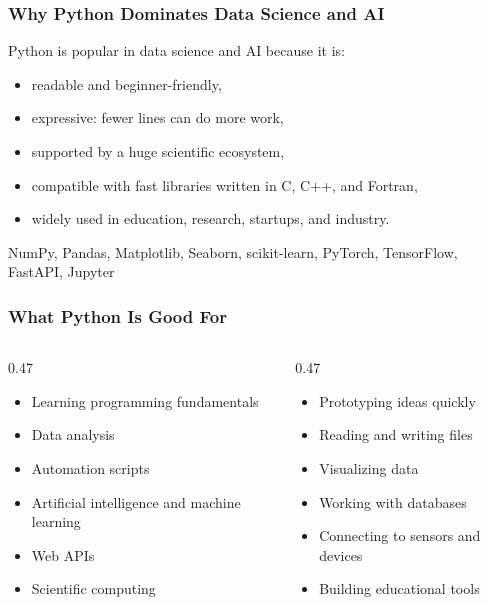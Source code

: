 \documentclass[aspectratio=169,10pt]{beamer}
\newcommand{\myitem}[1]{\item #1\vspace{0.04cm}}
\begin{document}
\begin{frame}
\frametitle{Why Python Dominates Data Science and AI}
\vspace{0.7cm}
{\large Python is popular in data science and AI because it is:}
\vspace{0.15cm}
\begin{itemize}
  \myitem{readable and beginner-friendly,}
  \myitem{expressive: fewer lines can do more work,}
  \myitem{supported by a huge scientific ecosystem,}
  \myitem{compatible with fast libraries written in C, C++, and Fortran,}
  \myitem{widely used in education, research, startups, and industry.}
\end{itemize}

\vspace{0.15cm}
\begin{tcolorbox}[lecturebox,title=Important libraries you will meet later]
\ttfamily NumPy, Pandas, Matplotlib, Seaborn, scikit-learn, PyTorch, TensorFlow, FastAPI, Jupyter
\end{tcolorbox}
\end{frame}


\begin{frame}
\frametitle{What Python Is Good For}
\vspace{1.1cm}
\begin{columns}[T,totalwidth=\textwidth]
\begin{column}{0.47\textwidth}
\begin{itemize}
  \myitem{Learning programming fundamentals}
  \myitem{Data analysis}
  \myitem{Automation scripts}
  \myitem{Artificial intelligence and machine learning}
  \myitem{Web APIs}
  \myitem{Scientific computing}
\end{itemize}
\end{column}
\begin{column}{0.47\textwidth}
\begin{itemize}
  \myitem{Prototyping ideas quickly}
  \myitem{Reading and writing files}
  \myitem{Visualizing data}
  \myitem{Working with databases}
  \myitem{Connecting to sensors and devices}
  \myitem{Building educational tools}
\end{itemize}
\end{column}
\end{columns}
\end{frame}
\end{document}

